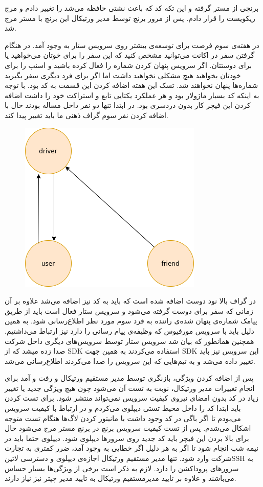 \documentclass[a4]{report}
\begin{document}
برنچی از مستر گرفته و این تکه کد که باعث نشتی حافظه می‌شد را تغییر دادم و مرج ریکويست را قرار دادم. پس از مرور برنچ توسط مدیر ورتیکال این برنچ با مستر مرج شد.


در هفته‌ی سوم فرصت برای توسعه‌ی بیشتر روی سرویس ستار به وجود آمد.
در هنگام گرفتن سفر در اکانت می‌توانید مشخص کنید که این سفر را برای خوتان می‌خواهید یا برای دوستتان.
اگر سرویس پنهان کردن شماره را فعال کرده باشید و اسنپ را برای خودتان بخواهید هیچ مشکلی نخواهید داشت اما اگر برای فرد دیگری سفر بگیرید شماره‌ها پنهان نخواهند شد.
تسک این هفته اضافه کردن این قسمت به کد بود.
با توجه به اینکه کد بسیار ماژولار بود و هر عملکرد یکتایی تابع و استراکت خود را داشت اضافه کردن این فیچر کار بدون دردسری بود.
در ابتدا تنها دو نفر داخل مساله بودند حال با اضافه کردن نفر سوم گراف ذهنی ما باید
تغییر پیدا کند.

\begin{figure}
  \centering
  \includegraphics[scale=0.5]{fig/call-graph}
\end{figure}

در گراف بالا نود دوست اضافه شده است که باید به کد نیز اضافه می‌شد علاوه بر آن زمانی که سفر برای دوست گرفته می‌شود و سرویس ستار فعال است
باید از طریق پیامک شماره‌ی پنهان شده‌ی راننده به فرد سوم مورد نظر اطلاع‌رسانی شود.
به همین دلیل باید با سرویس مورفیوس که وظیفه‌ی پیام رسانی را دارد نیز ارتباط می‌داشتیم.
همچنین همانطور که بیان شد سرویس ستار توسط سرویس‌های دیگری داخل شرکت صدا زده میشد که از SDK استفاده می‌کردند
به همین جهت SDK این سرویس نیز باید تغییر داده می‌شد و به تیم‌هایی که این سرویس را صدا می‌کردند اطلاع‌رسانی می‌شد.


پس از اضافه کردن ویژگی، بازنگری توسط مدیر مستقیم ورتیکال و رفت و آمد برای انجام تغییرات مدیر ورتیکال، نوبت به تست آن می‌شود
چون هیچ ویژگی جدید یا تغییر زیاد در کد بدون امضای نیروی کیفیت سرویس نمی‌تواند منتشر شود. برای تست کردن باید ابتدا کد را داخل محیط تستی دیپلوی می‌کردم و در ارتباط با کیفیت سرویس می‌بودم
تا اگر باگی در کد وجود داشت با مانیتور کردن لاگ‌ها هنگام تست متوجه اشکال می‌شدم. پس از تست کیفیت سرویس برنچ در برنچ مستر مرج می‌شود
حال برای بالا بردن این فیچر باید کد جدید روی سرورها دیپلوی شود.
دیپلوی حتما باید در نیمه شب انجام شود تا اگر به هر دلیل اگر خطایی به وجود آمد، ضرر کمتری به تجارت شرکت وارد شود. تنها مدیر مستقیم ورتیکال اجازه‌ی دیپلوی و دسترسی ‌لاتین{SSH} به سرورهای
پروداکشن را دارد. لازم به ذکر است برخی از ویژگی‌ها بسیار حساس می‌باشند و علاوه بر تایید مدیرمستقیم ورتیکال به تایید مدیر چپتر نیز نیاز دارند.
\end{document}
